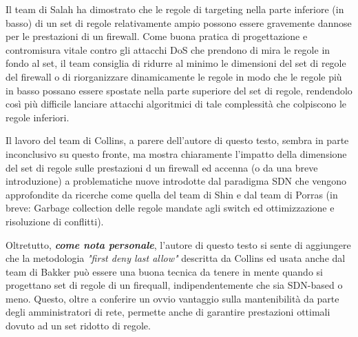 \onehalfspacing


Il team di Salah ha dimostrato che le regole di targeting nella parte inferiore (in basso) di un set di regole relativamente ampio possono essere gravemente dannose per le prestazioni di un firewall. Come buona pratica di progettazione e contromisura vitale contro gli attacchi DoS che prendono di mira le regole in fondo al set, il team consiglia di ridurre al minimo le dimensioni del set di regole del firewall o di riorganizzare dinamicamente le regole in modo che le regole più in basso possano essere spostate nella parte superiore del set di regole, rendendolo così più difficile lanciare attacchi algoritmici di tale complessità che colpiscono le regole inferiori.

Il lavoro del team di Collins, a parere dell'autore di questo testo, sembra in parte inconclusivo su questo fronte, ma mostra chiaramente l'impatto della dimensione del set di regole sulle prestazioni d un firewall ed accenna (o da una breve introduzione) a problematiche nuove introdotte dal paradigma SDN che vengono approfondite da ricerche come quella del team di Shin \cite{shin2013fresco} e dal team di Porras \cite{porras2012security} (in breve: Garbage collection delle regole mandate agli switch ed ottimizzazione e risoluzione di conflitti).


Oltretutto, \textbf{\textit{come nota personale}}, l'autore di questo testo si sente di aggiungere che la metodologia \textit{"first deny last allow"} descritta da Collins ed usata anche dal team di Bakker \cite{bakker2016network} può essere una buona tecnica da tenere in mente quando si progettano set di regole di un firequall, indipendentemente che sia SDN-based o meno. Questo, oltre a conferire un ovvio vantaggio sulla mantenibilità da parte degli amministratori di rete, permette anche di garantire prestazioni ottimali dovuto ad un set ridotto di regole.

